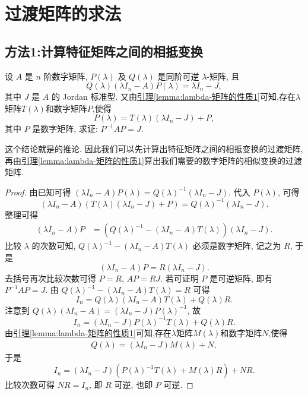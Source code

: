 \documentclass[../../main.tex]{subfiles}%
\begin{document}
\section{过渡矩阵的求法}\label{section:过渡矩阵的求法}

\subsection{方法1:计算特征矩阵之间的相抵变换}

\begin{corollary}\label{proposition:两个数字矩阵相似当且仅当它们的特征矩阵作为}
设 $A$ 是 $n$ 阶数字矩阵, $P(\lambda)$ 及 $Q(\lambda)$ 是同阶可逆 $\lambda$-矩阵, 且
\[
Q(\lambda)(\lambda I_n - A)P(\lambda) = \lambda I_n - J,
\]
其中 $J$ 是 $A$ 的 Jordan 标准型. 又由\hyperref[lemma:lambda-矩阵的性质1]{引理\ref{lemma:lambda-矩阵的性质1}}可知,存在$\lambda$矩阵$T(\lambda)$和数字矩阵$P$,使得
\[
P(\lambda) = T(\lambda)(\lambda I_n - J) + P,
\]
其中 $P$ 是数字矩阵, 求证: $P^{-1}AP = J$.
\end{corollary}
\begin{remark}
这个结论就是的推论. 因此我们可以先计算出特征矩阵之间的相抵变换的过渡矩阵,再由\hyperref[lemma:lambda-矩阵的性质1]{引理\ref{lemma:lambda-矩阵的性质1}}算出我们需要的数字矩阵的相似变换的过渡矩阵.
\end{remark}
\begin{proof}
由已知可得 $(\lambda I_n - A)P(\lambda) = Q(\lambda)^{-1}(\lambda I_n - J)$. 代入 $P(\lambda)$, 可得
\[
(\lambda I_n - A)(T(\lambda)(\lambda I_n - J) + P) = Q(\lambda)^{-1}(\lambda I_n - J).
\]
整理可得
\begin{align*}
(\lambda I_n - A)P &= \left(Q(\lambda)^{-1} - (\lambda I_n - A)T(\lambda)\right)(\lambda I_n - J).
\end{align*}
比较 $\lambda$ 的次数可知, $Q(\lambda)^{-1} - (\lambda I_n - A)T(\lambda)$ 必须是数字矩阵, 记之为 $R$, 于是
\[
(\lambda I_n - A)P = R(\lambda I_n - J).
\]
去括号再次比较次数可得 $P = R$, $AP = RJ$. 若可证明 $P$ 是可逆矩阵, 即有 $P^{-1}AP = J$. 由 $Q(\lambda)^{-1} - (\lambda I_n - A)T(\lambda) = R$ 可得
\[
I_n = Q(\lambda)(\lambda I_n - A)T(\lambda) + Q(\lambda)R.
\]
注意到 $Q(\lambda)(\lambda I_n - A) = (\lambda I_n - J)P(\lambda)^{-1}$, 故
\[
I_n = (\lambda I_n - J)P(\lambda)^{-1}T(\lambda) + Q(\lambda)R.
\]
由\hyperref[lemma:lambda-矩阵的性质1]{引理\ref{lemma:lambda-矩阵的性质1}}可知,存在$\lambda$矩阵$M(\lambda)$和数字矩阵$N$,使得
\begin{align*}
Q(\lambda) = (\lambda I_n - J)M(\lambda) + N,
\end{align*}
于是
\[
I_n = (\lambda I_n - J)\left(P(\lambda)^{-1}T(\lambda) + M(\lambda)R\right) + NR.
\]
比较次数可得 $NR = I_n$, 即 $R$ 可逆, 也即 $P$ 可逆. 
\end{proof}
\end{document}
